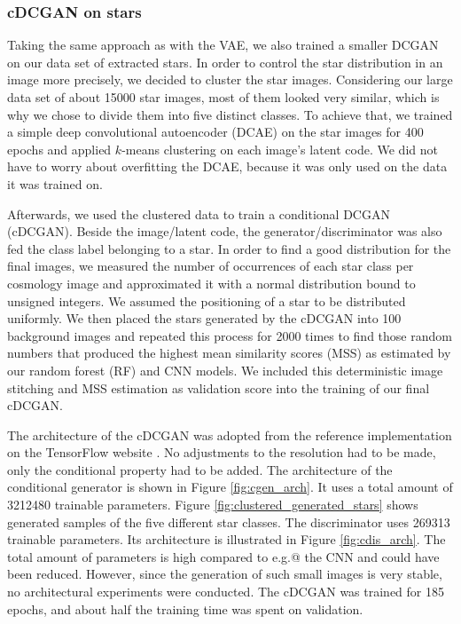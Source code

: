 \documentclass[10pt,conference,compsocconf]{IEEEtran}
\begin{document}
\subsubsection{cDCGAN on stars}
Taking the same approach as with the VAE, we also trained a smaller DCGAN on our data set of extracted stars.
In order to control the star distribution in an image more precisely, we decided to cluster the star images. Considering our large data set of about \SI{15000}{} star images, most of them looked very similar, which is why we chose to divide them into five distinct classes. To achieve that, we trained a simple deep convolutional autoencoder (DCAE) on the star images for 400 epochs and applied $k$-means clustering on each image's latent code. We did not have to worry about overfitting the DCAE, because it was only used on the data it was trained on.

Afterwards, we used the clustered data to train a conditional DCGAN (cDCGAN). Beside the image/latent code, the generator/discriminator was also fed the class label belonging to a star. In order to find a good distribution for the final images, we measured the number of occurrences of each star class per cosmology image and approximated it with a normal distribution bound to unsigned integers. We assumed the positioning of a star to be distributed uniformly. We then placed the stars generated by the cDCGAN into \SI{100}{} background images and repeated this process for \SI{2000}{} times to find those random numbers that produced the highest mean similarity scores (MSS) as estimated by our random forest (RF) and CNN models. We included this deterministic image stitching and MSS estimation as validation score into the training of our final cDCGAN.


The architecture of the cDCGAN was adopted from the reference implementation on the TensorFlow website \cite{dcgantf}. No adjustments to the resolution had to be made, only the conditional property had to be added. The architecture of the conditional generator is shown in Figure \ref{fig:cgen_arch}. It uses a total amount of \SI{3212480}{} trainable parameters. Figure \ref{fig:clustered_generated_stars} shows generated samples of the five different star classes. The discriminator uses \SI{269313}{} trainable parameters. Its architecture is illustrated in Figure \ref{fig:cdis_arch}. The total amount of parameters is high compared to e.g.@ the CNN and could have been reduced. However, since the generation of such small images is very stable, no architectural experiments were conducted. The cDCGAN was trained for 185 epochs, and about half the training time was spent on validation.
\end{document}
